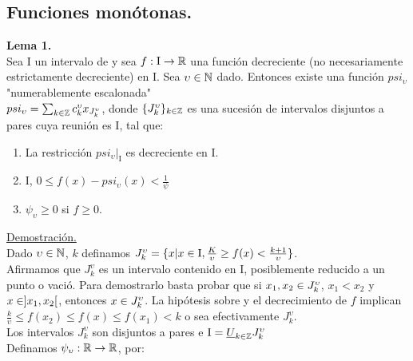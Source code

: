 \subsection{Funciones monótonas.}

\textbf{Lema 1.} \\
Sea $\mathrm{I}$ un intervalo de \R \phantom{} y sea $f:\mathrm{I} \rightarrow \mathbb{R}$ una función decreciente (no necesariamente estrictamente decreciente) en $\mathrm{I}$. Sea $\upsilon \in \mathbb{N}$ dado. Entonces existe una función $psi_\upsilon$ "numerablemente escalonada" \\
$psi_\upsilon=\sum_{k \in \mathbb{Z}} c_k^\upsilon x_{J_k^\upsilon}$, donde $\lbrace J_k^\upsilon \rbrace_{k \in \mathbb{Z}}$ es una sucesión de intervalos disjuntos a pares cuya reunión es $\mathrm{I}$, tal que:

\begin{enumerate}[1)]
\item La restricción $psi_\upsilon |_{\mathrm{I}}$ es decreciente en $\mathrm{I}$.
\item \todo \phantom{} \x \en $\mathrm{I}$, $0 \leq f(x)-psi_\upsilon (x) < \frac{1}{\psi}$

\item $\psi_\upsilon \geq 0$ si $f \geq 0$. 
\end{enumerate}

\underline{Demostración.}\\
Dado $\upsilon \in \mathbb{N}$, \todo \phantom{} $k$ \en \Z \phantom{} definamos $J_k^\upsilon=\lbrace x| x\in \mathrm{I}, \frac{K}{\upsilon} \geq f(x) < \frac{k+1}{\upsilon} \rbrace$. \\
Afirmamos que $J_k^\upsilon$ es un intervalo contenido en $\mathrm{I}$, posiblemente reducido a un punto o vació. Para demostrarlo basta probar que si $x_1,x_2 \in J_k^\upsilon$, $x_1 < x_2$ y $x \in ]x_1,x_2[$, entonces $x \in J_k^\upsilon$. La hipótesis sobre \x \phantom{} y el decrecimiento de $f$ implican $\frac{k}{\upsilon} \leq f(x_2) \leq f(x) \leq f(x_1) < k$ o sea efectivamente \x \en $J_k^\upsilon$.\\
Los intervalos $J_k^\upsilon$ son disjuntos a pares e $\mathrm{I}=\underline{U}_{k \in \mathbb{Z}}J_k^\upsilon$ \\
Definamos $\psi_\upsilon: \mathbb{R} \rightarrow \mathbb{R}$, por:

